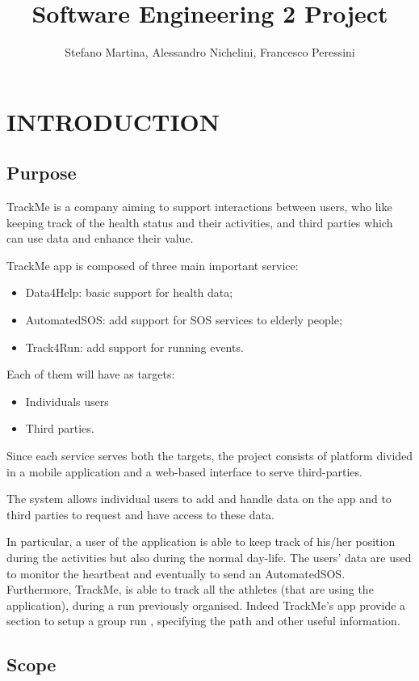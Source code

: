 \documentclass{article}
\title{Software Engineering 2 Project}
\author{Stefano Martina, Alessandro Nichelini, Francesco Peressini}
\begin{document}
\maketitle

\section{INTRODUCTION}

\subsection{Purpose}

TrackMe is a company aiming to support interactions between users, who like keeping track of the health status and their activities, and third parties which can use data and enhance their value.

TrackMe app is composed of three main important service:
\begin{itemize}
\item Data4Help: basic support for health data;
\item AutomatedSOS: add support for SOS services to elderly people;
\item Track4Run: add support for running events.
\end{itemize}

Each of them will have as targets:
\begin{itemize}
\item Individuals users
\item Third parties.
\end{itemize}
Since each service serves both the targets, the project consists of platform divided in a mobile application and a web-based interface to serve third-parties.

The system allows individual users to add and handle data on the app and to third parties to request and have access to these data.

In particular, a user of the application is able to keep track of his/her position during the activities but also during the normal day-life. The users’ data are used to monitor the heartbeat and eventually to send an AutomatedSOS.
Furthermore, TrackMe, is able to track all the athletes (that are using the application), during a run previously organised. Indeed TrackMe’s app provide a section to setup a group run , specifying the path and other useful information.

\subsection{Scope}
\end{document}
